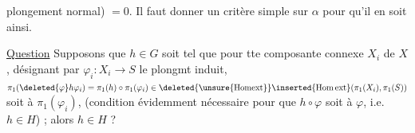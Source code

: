 
plongement normal) $=0$. Il faut donner un critère simple sur $\alpha$ pour qu'il en soit ainsi.

\uline{Question} Supposons que $h\in G$ soit tel que pour tte composante connexe $X_i$ de $X$, désignant par $\varphi_i:X_i\longrightarrow S$ le plongmt induit, $\pi_1(\deleted{\varphi}h\varphi_i)=\pi_1(h)\circ\pi_1(\varphi_i)\in\deleted{\unsure{\mathrm{Homext}}}\inserted{\mathrm{Hom\,ext}}(\pi_1(X_i),\pi_1(S))$ soit  à $\pi_1(\varphi_i)$,  (condition évidemment nécessaire pour que  $h\circ\varphi$ soit  à $\varphi$,  i.e. $h\in H$) ; alors  $h\in H$ ?

